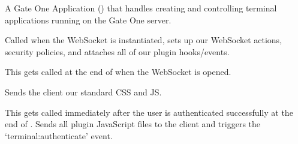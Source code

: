 \documentclass[letterpaper,10pt,openany]{sphinxmanual}
\begin{document}

\begin{fulllineitems}
\label{Applications/terminal/app_terminal:app_terminal.TerminalApplication}
A Gate One Application () that handles creating and
controlling terminal applications running on the Gate One server.

\begin{fulllineitems}
\label{Applications/terminal/app_terminal:app_terminal.TerminalApplication.initialize}
Called when the WebSocket is instantiated, sets up our WebSocket
actions, security policies, and attaches all of our plugin hooks/events.

\end{fulllineitems}


\begin{fulllineitems}
\label{Applications/terminal/app_terminal:app_terminal.TerminalApplication.open}
This gets called at the end of  when
the WebSocket is opened.

\end{fulllineitems}


\begin{fulllineitems}
\label{Applications/terminal/app_terminal:app_terminal.TerminalApplication.send_client_files}
Sends the client our standard CSS and JS.

\end{fulllineitems}


\begin{fulllineitems}
\label{Applications/terminal/app_terminal:app_terminal.TerminalApplication.authenticate}
This gets called immediately after the user is authenticated
successfully at the end of .
Sends all plugin JavaScript files to the client and triggers the
`terminal:authenticate' event.


\end{fulllineitems}
\end{fulllineitems}
\end{document}
